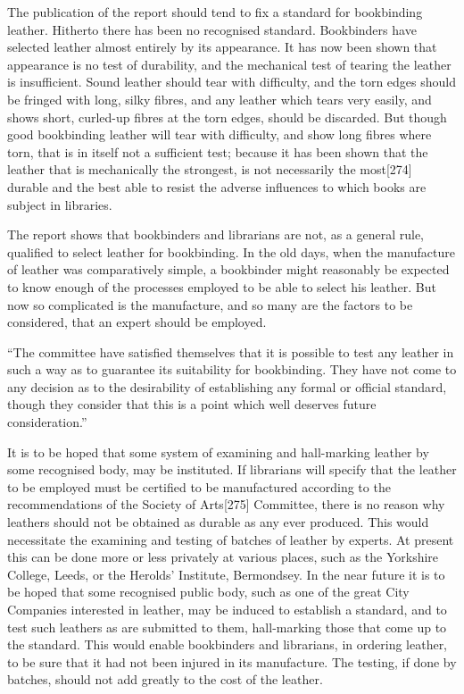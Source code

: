 \documentclass[
]{article}
\begin{document}
The publication of the report should tend to fix a standard for
bookbinding leather. Hitherto there has been no recognised standard.
Bookbinders have selected leather almost entirely by its appearance. It
has now been shown that appearance is no test of durability, and the
mechanical test of tearing the leather is insufficient. Sound leather
should tear with difficulty, and the torn edges should be fringed with
long, silky fibres, and any leather which tears very easily, and shows
short, curled-up fibres at the torn edges, should be discarded. But
though good bookbinding leather will tear with difficulty, and show long
fibres where torn, that is in itself not a sufficient test; because it
has been shown that the leather that is mechanically the strongest, is
not necessarily the most{\protect\hypertarget{Page_274}{}{{[}274{]}}}
durable and the best able to resist the adverse influences to which
books are subject in libraries.

The report shows that bookbinders and librarians are not, as a general
rule, qualified to select leather for bookbinding. In the old days, when
the manufacture of leather was comparatively simple, a bookbinder might
reasonably be expected to know enough of the processes employed to be
able to select his leather. But now so complicated is the manufacture,
and so many are the factors to be considered, that an expert should be
employed.

``The committee have satisfied themselves that it is possible to test
any leather in such a way as to guarantee its suitability for
bookbinding. They have not come to any decision as to the desirability
of establishing any formal or official standard, though they consider
that this is a point which well deserves future consideration.''

It is to be hoped that some system of examining and hall-marking leather
by some recognised body, may be instituted. If librarians will specify
that the leather to be employed must be certified to be manufactured
according to the recommendations of the Society of
Arts{\protect\hypertarget{Page_275}{}{{[}275{]}}} Committee, there is no
reason why leathers should not be obtained as durable as any ever
produced. This would necessitate the examining and testing of batches of
leather by experts. At present this can be done more or less privately
at various places, such as the Yorkshire College, Leeds, or the Herolds'
Institute, Bermondsey. In the near future it is to be hoped that some
recognised public body, such as one of the great City Companies
interested in leather, may be induced to establish a standard, and to
test such leathers as are submitted to them, hall-marking those that
come up to the standard. This would enable bookbinders and librarians,
in ordering leather, to be sure that it had not been injured in its
manufacture. The testing, if done by batches, should not add greatly to
the cost of the leather.
\end{document}

